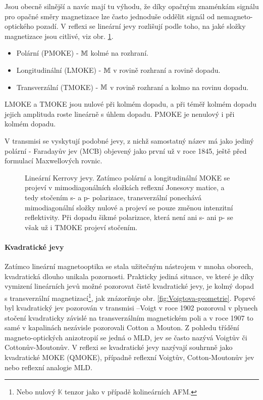 Jsou obecně silnější a navíc mají tu výhodu, že díky opačným znaménkám signálu pro opačné směry magnetizace lze často jednoduše oddělit signál od nemagneto-optického pozadí.
V reflexi se lineární jevy rozlišují podle toho, na jaké složky magnetizace jsou citlivé, viz obr. \ref{fig:MOKE-Silber}.
\begin{itemize}
\item Polární (PMOKE) - $\mathbb{M}$ kolmé na rozhraní.
\item Longitudinální (LMOKE) - $\mathbb{M}$ v rovině rozhraní a rovině dopadu.
\item Transverzální (TMOKE) - $\mathbb{M}$ v rovině rozhraní a kolmo na rovinu dopadu.
\end{itemize}
LMOKE a TMOKE jsou nulové při kolmém dopadu, a při téměř kolmém dopadu jejich amplituda roste lineárně s úhlem dopadu.
PMOKE je nenulový i při kolmém dopadu.

V transmisi se vyskytují podobné jevy, z nichž samostatný název má jako jediný polární - Faradayův jev (MCB) objevený jako první už v roce 1845, ještě před formulací Maxwellových rovnic. 

\begin{figure}[htbp]
    \centering
    \caption{Lineární Kerrovy jevy. Zatímco polární a longitudinální MOKE se projeví v mimodiagonálních složkách reflexní Jonesovy matice, a tedy stočením s- a p- polarizace, transverzální ponechává mimodiagonální složky nulové a projeví se pouze změnou intenzitní reflektivity. Při dopadu šikmé polarizace, která není ani s- ani p- se však už i TMOKE projeví stočením.}
    \label{fig:MOKE-Silber}
\end{figure}

\paragraph{Kvadratické jevy}

Zatímco lineární magnetooptika se stala užitečným nástrojem v mnoha oborech, kvadratická dlouho unikala pozornosti.
Prakticky jediná situace, ve které je díky vymizení lineárních jevů možné pozorovat čistě kvadratické jevy, je kolmý dopad s transverzální magnetizací\footnote{Nebo nulový $\mathbb{K}$ tenzor jako v případě kolineárních AFM.}, jak znázorňuje obr. \ref{fig:Voigtova-geometrie}.
Poprvé byl kvadratický jev pozorován v transmisi --\tododash Voigt v roce 1902 pozoroval v plynech stočení kvadraticky závislé na transverzálním magnetickém poli a v roce 1907 to samé v kapalinách nezávisle pozorovali Cotton a Mouton. 
Z pohledu třídění magneto-optických anizotropií se jedná o MLD, jev se často nazývá Voigtův či Cottonův-Moutonův.
V reflexi se kvadratické jevy nazývají souhrnně jako kvadratické MOKE (QMOKE), případně reflexní Voigtův, Cotton-Moutonův jev nebo reflexní analogie MLD.

